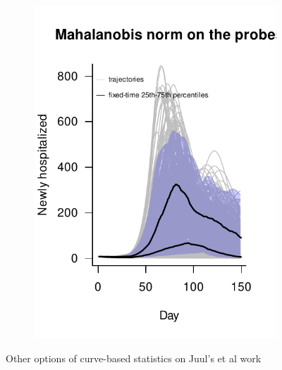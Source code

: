 \documentclass[12pt]{article}
\theoremstyle{definition} %
\begin{document}
\begin{figure}[h!]
\begin{subfigure}[t]{.45\textwidth}
\includegraphics[width=\linewidth]{scripts/pix/mahal_probes_juul.pdf}
\caption{}\label{p.d}
\end{subfigure}
\caption{Other options of curve-based statistics on Juul's et al work}
\label{pan}
\end{figure}



\end{document}
